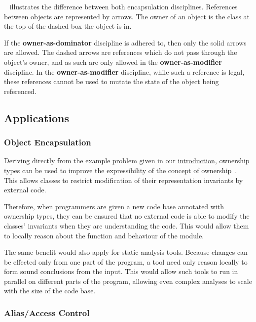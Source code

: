 \documentclass{acm_proc_article-sp}
\begin{document}
~\cite{dietl09gut} illustrates the 
difference between both encapsulation disciplines. References between objects 
are represented by arrows. The owner of an object is the class at the top of 
the dashed box the object is in.

If the \textbf{owner-as-dominator} discipline is adhered to, then only the 
solid arrows are allowed. The dashed arrows are references which do not pass 
through the object's owner, and as such are only allowed in the 
\textbf{owner-as-modifier} discipline. In the \textbf{owner-as-mod\-ifier} 
discipline, while such a reference is legal, these references cannot be used to 
mutate the state of the object being referenced.

\subsection{Applications}
\label{subsec:applications}

\subsubsection{Object Encapsulation}
\label{subsubsec:object_encapsulation}

Deriving directly from the example problem given in our 
\hyperref[code:modular_reasoning_car_engine_1]{introduction}, ownership types 
can be used to improve the expressibility of the concept of 
ownership~\cite{clarke98ownership}. This allows classes to restrict 
modification of their representation invariants by external code.

Therefore, when programmers are given a new code base annotated with ownership 
types, they can be ensured that no external code is able to modify the classes' 
invariants when they are understanding the code. This would allow them to 
locally reason about the function and behaviour of the module.

The same benefit would also apply for static analysis tools. Because changes 
can be effected only from one part of the program, a tool need only reason 
locally to form sound conclusions from the input. This would allow such tools 
to run in parallel on different parts of the program, allowing even complex 
analyses to scale with the size of the code base.

\subsubsection{Alias/Access Control}
\label{subsubsec:alias_control}
\end{document}
